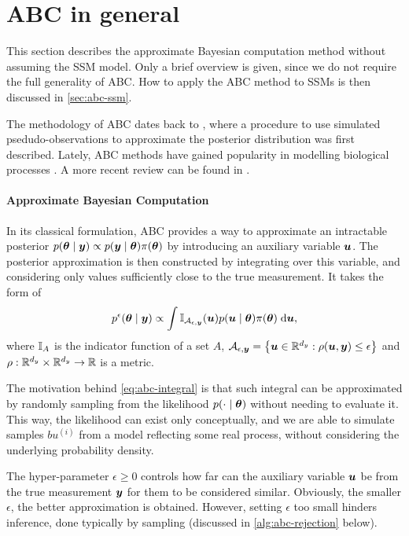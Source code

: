 \section{ABC in general} \label{sec:abc-general}
This section describes the approximate Bayesian computation method without assuming the SSM model. Only a brief overview is given, since we do not require the full generality of ABC. How to apply the ABC method to SSMs is then discussed in \autoref{sec:abc-ssm}.

The methodology of ABC dates back to \cite{abc-old-old}, where a procedure to use simulated psedudo-observations to approximate the posterior distribution was first described. Lately, ABC methods have gained popularity in modelling biological processes \citep{abc-old}. A more recent review can be found in \cite{abc-recent}.

\paragraph{Approximate Bayesian Computation}

In its classical formulation, ABC provides a way to approximate an intractable posterior $p(\bm{\theta} \mid \bm{y}) \propto p(\bm{y} \mid \bm{\theta}) \pi(\bm{\theta})$ by introducing an auxiliary variable $\bm{u}$. The posterior approximation is then constructed by integrating over this variable, and considering only values sufficiently close to the true measurement. It takes the form of
\begin{equation} \label{eq:abc-integral}
p^\epsilon(\bm{\theta} \mid \bm{y}) \propto \int \mathbb{I}_{\mathcal{A}_{\epsilon, \bm{y}}}(\bm{u}) p(\bm{u} \mid \bm{\theta}) \pi(\bm{\theta}) \; \mathrm{d}{\bm{u}},
\end{equation}
where $\mathbb{I}_A$ is the indicator function of a set $A$, $\mathcal{A}_{\epsilon, \bm{y}} = \left\{\bm{u} \in \mathbb{R}^{d_y} : \rho(\bm{u}, \bm{y}) \leq \epsilon \right\}$ and $\rho: \mathbb{R}^{d_y} \times \mathbb{R}^{d_y} \to \mathbb{R}$ is a metric.

The motivation behind \eqref{eq:abc-integral} is that such integral can be approximated by randomly sampling from the likelihood $p(\cdot \mid \bm{\theta})$ without needing to evaluate it. This way, the likelihood can exist only conceptually, and we are able to simulate samples $bu^{(i)}$ from a model reflecting some real process, without considering the underlying probability density.

The hyper-parameter $\epsilon \geq 0$ controls how far can the auxiliary variable $\bm{u}$ be from the true measurement $\bm{y}$ for them to be considered similar. Obviously, the smaller $\epsilon$, the better approximation is obtained. However, setting $\epsilon$ too small hinders inference, done typically by sampling (discussed in \autoref{alg:abc-rejection} below).


